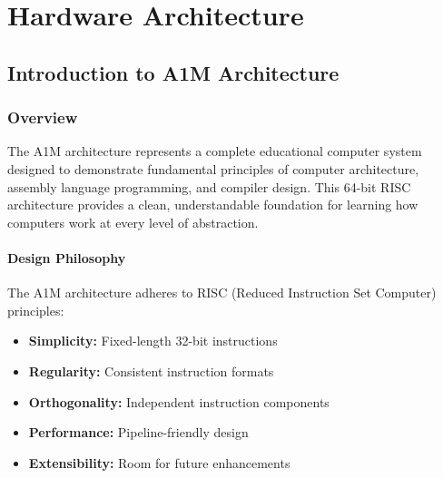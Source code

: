 \documentclass[12pt,a4paper,oneside]{book}
\begin{document}
\listoffigures
\newpage

\listoftables
\newpage

\lstlistoflistings
\newpage

\part{Hardware Architecture}

\chapter{Introduction to A1M Architecture}

\section{Overview}

The A1M architecture represents a complete educational computer system designed to demonstrate fundamental principles of computer architecture, assembly language programming, and compiler design. This 64-bit RISC architecture provides a clean, understandable foundation for learning how computers work at every level of abstraction.

\subsection{Design Philosophy}

The A1M architecture adheres to RISC (Reduced Instruction Set Computer) principles:

\begin{itemize}
    \item \textbf{Simplicity:} Fixed-length 32-bit instructions
    \item \textbf{Regularity:} Consistent instruction formats
    \item \textbf{Orthogonality:} Independent instruction components
    \item \textbf{Performance:} Pipeline-friendly design
    \item \textbf{Extensibility:} Room for future enhancements
\end{itemize}
\end{document}

